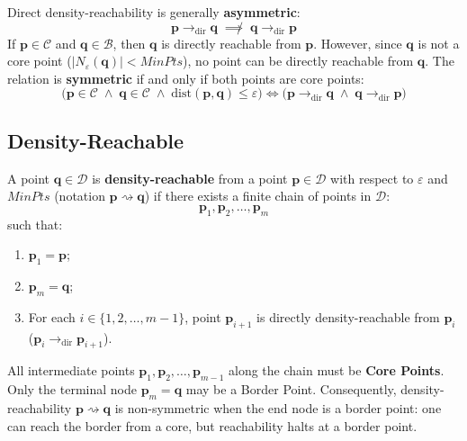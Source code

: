 \begin{property}
Direct density-reachability is generally \textbf{asymmetric}:
\begin{equation}
    \mathbf{p} \to_{\mathrm{dir}} \mathbf{q} \;\not\implies\; \mathbf{q} \to_{\mathrm{dir}} \mathbf{p}
\end{equation}
If $\mathbf{p} \in \mathcal{C}$ and $\mathbf{q} \in \mathcal{B}$, then $\mathbf{q}$ is directly reachable from $\mathbf{p}$. However, since $\mathbf{q}$ is not a core point ($|N_\varepsilon(\mathbf{q})| < MinPts$), no point can be directly reachable from $\mathbf{q}$. The relation is \textbf{symmetric} if and only if both points are core points:
\begin{equation}
    \big(\mathbf{p} \in \mathcal{C} \;\land\; \mathbf{q} \in \mathcal{C} \;\land\; \mathrm{dist}(\mathbf{p}, \mathbf{q}) \le \varepsilon\big) \iff \big(\mathbf{p} \to_{\mathrm{dir}} \mathbf{q} \;\land\; \mathbf{q} \to_{\mathrm{dir}} \mathbf{p}\big)
\end{equation}
\end{property}

\subsection{Density-Reachable}

\begin{definition}
A point $\mathbf{q} \in \mathcal{D}$ is \textbf{density-reachable} from a point $\mathbf{p} \in \mathcal{D}$ with respect to $\varepsilon$ and $MinPts$ (notation $\mathbf{p} \rightsquigarrow \mathbf{q}$) if there exists a finite chain of points in $\mathcal{D}$:
\begin{equation}
    \mathbf{p}_1, \mathbf{p}_2, \dots, \mathbf{p}_m
\end{equation}
such that:
\begin{enumerate}
    \item $\mathbf{p}_1 = \mathbf{p}$;
    \item $\mathbf{p}_m = \mathbf{q}$;
    \item For each $i \in \{1, 2, \dots, m-1\}$, point $\mathbf{p}_{i+1}$ is directly density-reachable from $\mathbf{p}_i$ ($\mathbf{p}_i \to_{\mathrm{dir}} \mathbf{p}_{i+1}$).
\end{enumerate}
\end{definition}

\begin{remark}
All intermediate points $\mathbf{p}_1, \mathbf{p}_2, \dots, \mathbf{p}_{m-1}$ along the chain must be \textbf{Core Points}. Only the terminal node $\mathbf{p}_m = \mathbf{q}$ may be a Border Point. Consequently, density-reachability $\mathbf{p} \rightsquigarrow \mathbf{q}$ is non-symmetric when the end node is a border point: one can reach the border from a core, but reachability halts at a border point.
\end{remark}

